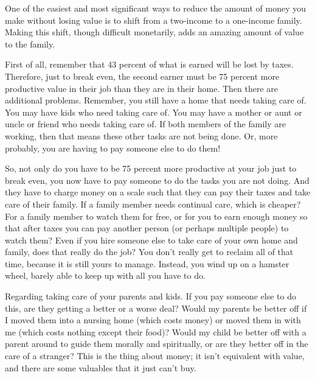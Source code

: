 \begin{infonote}
One of the easiest and most significant ways to reduce the amount of
money you make without losing value is to shift from a two-income to a
one-income family. Making this shift, though difficult monetarily, adds
an amazing amount of value to the family.

First of all, remember that 43 percent of what is earned will be lost by
taxes. Therefore, just to break even, the second earner must be 75
percent more productive value in their job than they are in their home.
Then there are
additional problems. Remember, you still have a home that needs taking
care of. You may have kids who need taking care of. You may have a
mother or aunt or uncle or friend who needs taking care of. If both
members of the family are working, then that means these other tasks
are not being done. Or, more probably, you are having to pay someone
else to do them!

So, not only do you have to be 75 percent more productive at your job
just to break even, you now have to pay someone to do the tasks you are
not doing. And they have to charge money on a scale such that they can
pay their taxes and take care of their family. If a family member needs
continual care, which is cheaper? For a family member to watch them for
free, or for you to earn enough money so that after taxes you can pay
another person (or perhaps multiple people) to watch them?  Even if you
hire someone else to take care of your own home and family, does that
really do the job?  You don’t really get to reclaim all of that time,
because it is still yours to manage. Instead, you wind up on a hamster
wheel, barely able to keep up with all you have to do.

Regarding taking care
of your parents and kids. If you pay someone else to do this, are they
getting a better or a worse deal?  Would my parents be better off if I
moved them into a nursing home (which costs money) or moved them in
with me (which costs nothing except their food)?  Would my child be
better off with a parent around to guide them morally and spiritually,
or are they better off in the care of a stranger?  This is the thing
about money; it isn’t equivalent with value, and there are some
valuables that it just can’t buy.


\end{infonote}

